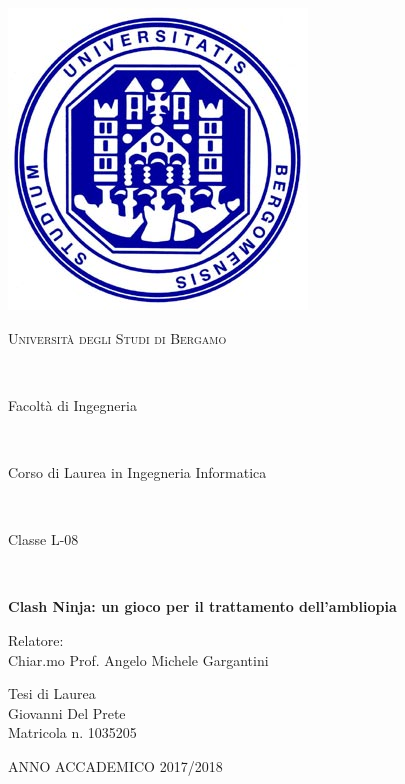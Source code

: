 \thispagestyle{empty}
\begin{center}
	\includegraphics[scale=0.3]{logo.jpg}\\
	\bigskip
	\begin{LARGE}\textsc{Università degli Studi di Bergamo}\end{LARGE}\\
	\begin{Large}Facoltà di Ingegneria\end{Large}\\
	\begin{large}Corso di Laurea in Ingegneria Informatica\end{large}\\
	\begin{large}Classe L-08 \end{large}\\
	\null{}
	\begin{large}\textbf{Clash Ninja: un gioco per il trattamento dell'ambliopia }\end{large}
	\vspace{3cm}
	\null
\end{center}
\begin{flushleft}
	\begin{large}Relatore:\\
		Chiar.mo Prof. Angelo Michele Gargantini\\\end{large}
	\vspace{1cm}
\end{flushleft}
\bigskip
\bigskip
\bigskip
\begin{flushright}
	\begin{large}Tesi di Laurea\\
		Giovanni Del Prete\\
		Matricola n. 1035205\\
	\end{large}
\end{flushright}
\bigskip
\bigskip
\begin{center}                        
	\vspace{4cm}
	ANNO ACCADEMICO 2017/2018              
\end{center}
\newpage
\thispagestyle{empty}
\mbox{}